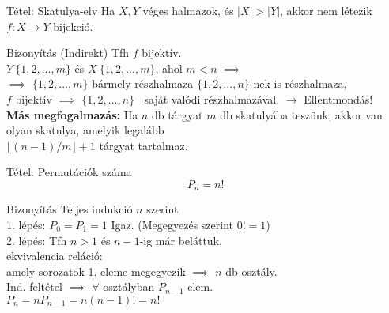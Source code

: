 \documentclass{beamer}
\begin{document}
\begin{frame}

\begin{block}{Tétel: Skatulya-elv}
Ha $X, Y$ véges halmazok, és $|X| > |Y|$, akkor nem létezik $f: X \rightarrow Y$ bijekció.

\end{block}

\begin{block}{Bizonyítás (Indirekt)}
Tfh $f$ bijektív.\\
$Y ~ \{1, 2, ..., m\}$ és $X ~ \{1, 2, ..., m\}$, ahol $m < n$ $\implies$\\
$\implies$ $\{1, 2, ..., m\}$ bármely részhalmaza $\{1, 2, ..., n\}$-nek is részhalmaza,\\
$f$ bijektív $\implies$ $\{1, 2, ..., n\}$ $~$ saját valódi részhalmazával. $\rightarrow$ Ellentmondás!\\
\bigskip
\textbf{Más megfogalmazás:} Ha $n$ db tárgyat $m$ db skatulyába teszünk, akkor van olyan skatulya, amelyik legalább\\
$\lfloor (n - 1) / m \rfloor + 1$ tárgyat tartalmaz.

\end{block}

\end{frame}

\begin{frame}

\begin{block}{Tétel: Permutációk száma}
$$P_n = n!$$

\end{block}

\begin{block}{Bizonyítás}
Teljes indukció $n$ szerint\\
1. lépés: $P_0 = P_1 = 1$ Igaz. (Megegyezés szerint $0! = 1$)\\
2. lépés: Tfh $n > 1$ és $n - 1$-ig már beláttuk.\\
ekvivalencia reláció:\\
amely sorozatok 1. eleme megegyezik $\implies$ $n$ db osztály.\\
Ind. feltétel $\implies$ $\forall$ osztályban $P_{n - 1}$ elem.\\
$P_n = nP_{n - 1} = n(n - 1)! = n!$

\end{block}

\end{frame}
\end{document}
